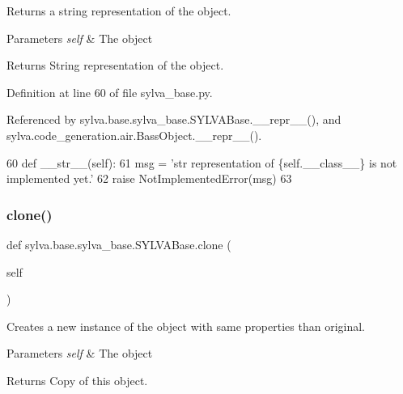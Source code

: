 Returns a string representation of the object. 


\begin{DoxyParams}{Parameters}
{\em self} & The object\\
\hline
\end{DoxyParams}
\begin{DoxyReturn}{Returns}
String representation of the object. 
\end{DoxyReturn}


Definition at line 60 of file sylva\+\_\+base.\+py.



Referenced by sylva.\+base.\+sylva\+\_\+base.\+S\+Y\+L\+V\+A\+Base.\+\_\+\+\_\+repr\+\_\+\+\_\+(), and sylva.\+code\+\_\+generation.\+air.\+Bass\+Object.\+\_\+\+\_\+repr\+\_\+\+\_\+().


\begin{DoxyCode}
60     \textcolor{keyword}{def }\_\_str\_\_(self):
61         msg = \textcolor{stringliteral}{'str representation of \{self.\_\_class\_\_\} is not implemented yet.'}
62         \textcolor{keywordflow}{raise} NotImplementedError(msg)
63 
\end{DoxyCode}
\mbox{\label{classsylva_1_1base_1_1sylva__base_1_1_s_y_l_v_a_base_a1597b4594cb73e0fa2597742239660f5}} 
\subsubsection{\texorpdfstring{clone()}{clone()}}
{\footnotesize\ttfamily def sylva.\+base.\+sylva\+\_\+base.\+S\+Y\+L\+V\+A\+Base.\+clone (\begin{DoxyParamCaption}\item[{}]{self }\end{DoxyParamCaption})}



Creates a new instance of the object with same properties than original. 


\begin{DoxyParams}{Parameters}
{\em self} & The object\\
\hline
\end{DoxyParams}
\begin{DoxyReturn}{Returns}
Copy of this object. 
\end{DoxyReturn}


